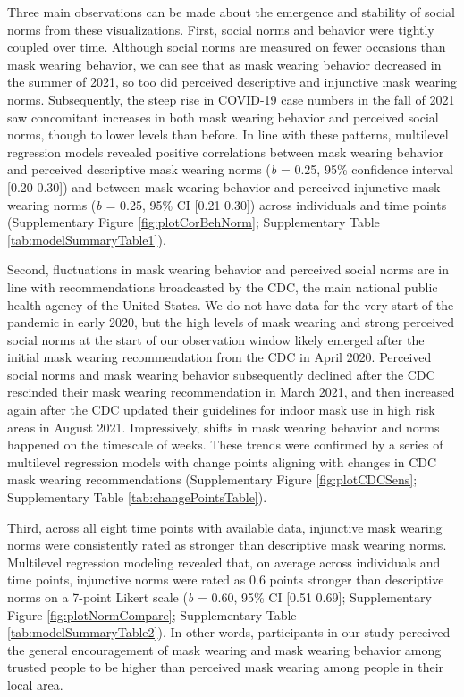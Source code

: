 \documentclass[
  english,
  man,floatsintext]{apa6}
\begin{document}
Three main observations can be made about the emergence and stability of social norms from these visualizations. First, social norms and behavior were tightly coupled over time. Although social norms are measured on fewer occasions than mask wearing behavior, we can see that as mask wearing behavior decreased in the summer of 2021, so too did perceived descriptive and injunctive mask wearing norms. Subsequently, the steep rise in COVID-19 case numbers in the fall of 2021 saw concomitant increases in both mask wearing behavior and perceived social norms, though to lower levels than before. In line with these patterns, multilevel regression models revealed positive correlations between mask wearing behavior and perceived descriptive mask wearing norms (\emph{b} = 0.25, 95\% confidence interval {[}0.20 0.30{]}) and between mask wearing behavior and perceived injunctive mask wearing norms (\emph{b} = 0.25, 95\% CI {[}0.21 0.30{]}) across individuals and time points (Supplementary Figure \ref{fig:plotCorBehNorm}; Supplementary Table \ref{tab:modelSummaryTable1}).

Second, fluctuations in mask wearing behavior and perceived social norms are in line with recommendations broadcasted by the CDC, the main national public health agency of the United States. We do not have data for the very start of the pandemic in early 2020, but the high levels of mask wearing and strong perceived social norms at the start of our observation window likely emerged after the initial mask wearing recommendation from the CDC in April 2020. Perceived social norms and mask wearing behavior subsequently declined after the CDC rescinded their mask wearing recommendation in March 2021, and then increased again after the CDC updated their guidelines for indoor mask use in high risk areas in August 2021. Impressively, shifts in mask wearing behavior and norms happened on the timescale of weeks. These trends were confirmed by a series of multilevel regression models with change points aligning with changes in CDC mask wearing recommendations (Supplementary Figure \ref{fig:plotCDCSens}; Supplementary Table \ref{tab:changePointsTable}).

Third, across all eight time points with available data, injunctive mask wearing norms were consistently rated as stronger than descriptive mask wearing norms. Multilevel regression modeling revealed that, on average across individuals and time points, injunctive norms were rated as 0.6 points stronger than descriptive norms on a 7-point Likert scale (\emph{b} = 0.60, 95\% CI {[}0.51 0.69{]}; Supplementary Figure \ref{fig:plotNormCompare}; Supplementary Table \ref{tab:modelSummaryTable2}). In other words, participants in our study perceived the general encouragement of mask wearing and mask wearing behavior among trusted people to be higher than perceived mask wearing among people in their local area.
\end{document}
